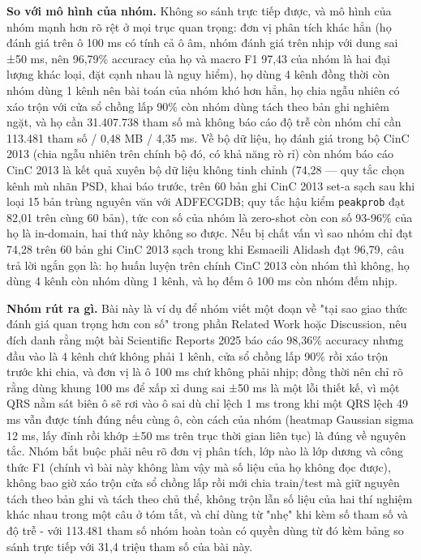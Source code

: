 \documentclass[12pt,a4paper]{article}
\begin{document}
\noindent \textbf{\color{tdtblue}So với mô hình của nhóm.} Không so sánh trực tiếp được, và mô hình của nhóm mạnh hơn rõ rệt ở mọi trục quan trọng: đơn vị phân tích khác hẳn (họ đánh giá trên ô 100 ms có tính cả ô âm, nhóm đánh giá trên nhịp với dung sai ±50 ms, nên 96,79\% accuracy của họ và macro F1 97,43 của nhóm là hai đại lượng khác loại, đặt cạnh nhau là nguy hiểm), họ dùng 4 kênh đồng thời còn nhóm dùng 1 kênh nên bài toán của nhóm khó hơn hẳn, họ chia ngẫu nhiên có xáo trộn với cửa sổ chồng lấp 90\% còn nhóm dùng tách theo bản ghi nghiêm ngặt, và họ cần 31.407.738 tham số mà không báo cáo độ trễ còn nhóm chỉ cần 113.481 tham số / 0,48 MB / 4,35 ms. Về bộ dữ liệu, họ đánh giá trong bộ CinC 2013 (chia ngẫu nhiên trên chính bộ đó, có khả năng rò rỉ) còn nhóm báo cáo CinC 2013 là kết quả xuyên bộ dữ liệu không tinh chỉnh (74,28 --- quy tắc chọn kênh mù nhãn PSD, khai báo trước, trên 60 bản ghi CinC 2013 set-a sạch sau khi loại 15 bản trùng nguyên văn với ADFECGDB; quy tắc hậu kiểm \texttt{peakprob} đạt 82,01 trên cùng 60 bản), tức con số của nhóm là zero-shot còn con số 93-96\% của họ là in-domain, hai thứ này không so được. Nếu bị chất vấn vì sao nhóm chỉ đạt 74,28 trên 60 bản ghi CinC 2013 sạch trong khi Esmaeili Alidash đạt 96,79, câu trả lời ngắn gọn là: họ huấn luyện trên chính CinC 2013 còn nhóm thì không, họ dùng 4 kênh còn nhóm dùng 1 kênh, và họ đếm ô 100 ms còn nhóm đếm nhịp.\par\vspace{3pt}
\noindent \textbf{\color{tdtblue}Nhóm rút ra gì.} Bài này là ví dụ để nhóm viết một đoạn về "tại sao giao thức đánh giá quan trọng hơn con số" trong phần Related Work hoặc Discussion, nêu đích danh rằng một bài Scientific Reports 2025 báo cáo 98,36\% accuracy nhưng đầu vào là 4 kênh chứ không phải 1 kênh, cửa sổ chồng lấp 90\% rồi xáo trộn trước khi chia, và đơn vị là ô 100 ms chứ không phải nhịp; đồng thời nên chỉ rõ rằng dùng khung 100 ms để xấp xỉ dung sai ±50 ms là một lỗi thiết kế, vì một QRS nằm sát biên ô sẽ rơi vào ô sai dù chỉ lệch 1 ms trong khi một QRS lệch 49 ms vẫn được tính đúng nếu cùng ô, còn cách của nhóm (heatmap Gaussian sigma 12 ms, lấy đỉnh rồi khớp ±50 ms trên trục thời gian liên tục) là đúng về nguyên tắc. Nhóm bắt buộc phải nêu rõ đơn vị phân tích, lớp nào là lớp dương và công thức F1 (chính vì bài này không làm vậy mà số liệu của họ không đọc được), không bao giờ xáo trộn cửa sổ chồng lấp rồi mới chia train/test mà giữ nguyên tách theo bản ghi và tách theo chủ thể, không trộn lẫn số liệu của hai thí nghiệm khác nhau trong một câu ở tóm tắt, và chỉ dùng từ "nhẹ" khi kèm số tham số và độ trễ - với 113.481 tham số nhóm hoàn toàn có quyền dùng từ đó kèm bảng so sánh trực tiếp với 31,4 triệu tham số của bài này.\par\vspace{3pt}
\vspace{6pt}
\end{document}
